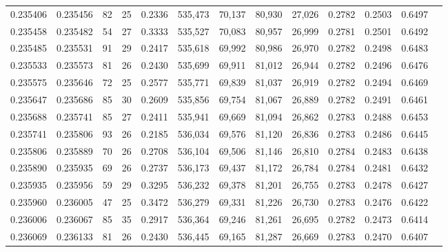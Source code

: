 \begin{tabular}{rrrrrrrrrrrrr}
0.235406 & 0.235456 &  82 &  25 &                                     0.2336 & 535,473 &  70,137 &  80,930 &  27,026 & 0.2782 & 0.2503 & 0.6497 \\
0.235458 & 0.235482 &  54 &  27 &                                     0.3333 & 535,527 &  70,083 &  80,957 &  26,999 & 0.2781 & 0.2501 & 0.6492 \\
0.235485 & 0.235531 &  91 &  29 &                                     0.2417 & 535,618 &  69,992 &  80,986 &  26,970 & 0.2782 & 0.2498 & 0.6483 \\
0.235533 & 0.235573 &  81 &  26 &                                     0.2430 & 535,699 &  69,911 &  81,012 &  26,944 & 0.2782 & 0.2496 & 0.6476 \\
0.235575 & 0.235646 &  72 &  25 &                                     0.2577 & 535,771 &  69,839 &  81,037 &  26,919 & 0.2782 & 0.2494 & 0.6469 \\
0.235647 & 0.235686 &  85 &  30 &                                     0.2609 & 535,856 &  69,754 &  81,067 &  26,889 & 0.2782 & 0.2491 & 0.6461 \\
0.235688 & 0.235741 &  85 &  27 &                                     0.2411 & 535,941 &  69,669 &  81,094 &  26,862 & 0.2783 & 0.2488 & 0.6453 \\
0.235741 & 0.235806 &  93 &  26 &                                     0.2185 & 536,034 &  69,576 &  81,120 &  26,836 & 0.2783 & 0.2486 & 0.6445 \\
0.235806 & 0.235889 &  70 &  26 &                                     0.2708 & 536,104 &  69,506 &  81,146 &  26,810 & 0.2784 & 0.2483 & 0.6438 \\
0.235890 & 0.235935 &  69 &  26 &                                     0.2737 & 536,173 &  69,437 &  81,172 &  26,784 & 0.2784 & 0.2481 & 0.6432 \\
0.235935 & 0.235956 &  59 &  29 &                                     0.3295 & 536,232 &  69,378 &  81,201 &  26,755 & 0.2783 & 0.2478 & 0.6427 \\
0.235960 & 0.236005 &  47 &  25 &                                     0.3472 & 536,279 &  69,331 &  81,226 &  26,730 & 0.2783 & 0.2476 & 0.6422 \\
0.236006 & 0.236067 &  85 &  35 &                                     0.2917 & 536,364 &  69,246 &  81,261 &  26,695 & 0.2782 & 0.2473 & 0.6414 \\
0.236069 & 0.236133 &  81 &  26 &                                     0.2430 & 536,445 &  69,165 &  81,287 &  26,669 & 0.2783 & 0.2470 & 0.6407 \\

\end{tabular}
